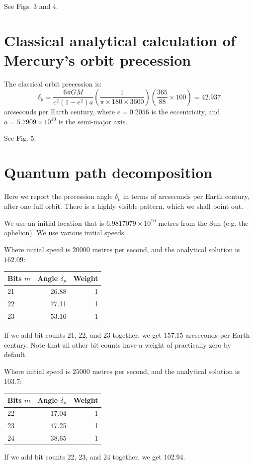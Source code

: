 \documentclass[12pt]{article}
\begin{document}
See Figs. 3 and 4.





\section{Classical analytical calculation of Mercury's orbit precession}

The classical orbit precession is:
\begin{equation}
\label{delta_p}
\delta_{p} = \frac{6 \pi G M}{c^2 (1 - e^2) a} \left( \frac{1}{ \pi \times 180 \times 3600} \right) \left( \frac{365}{88} \times 100 \right) = 42.937
\end{equation}
arcseconds per Earth century, where $e = 0.2056$ is the eccentricity, and $a = 5.7909 \times 10^{10}$ is the semi-major axis.

See Fig. 5.


\section{Quantum path decomposition}

Here we report the precession angle $\delta_{p}$ in terms of arcseconds per Earth century, after one full orbit.
There is a highly visible pattern, which we shall point out.

We use an initial location that is $6.9817079 \times 10^{10}$ metres from the Sun (e.g. the aphelion).
We use various initial speeds.

Where initial speed is $20000$ metres per second, and the analytical solution is $162.09$:
\begin{center}
\begin{tabular}{| l | r | r |}
  \hline
Bits $m$ & Angle $\delta_{p}$ & Weight\\
\hline
\hline
21 & 26.88 & 1 \\
22 & 77.11 & 1\\
23 & 53.16 & 1 \\
  \hline  
\end{tabular}
\end{center}
If we add bit counts 21, 22, and 23 together, we get $157.15$ arcseconds per Earth century.
Note that all other bit counts have a weight of practically zero by default.

Where initial speed is $25000$ metres per second, and the analytical solution is $103.7$:
\begin{center}
\begin{tabular}{| l | r | r |}
  \hline
Bits $m$ & Angle $\delta_{p}$ & Weight\\
\hline
\hline
22 & 17.04 & 1\\
23 & 47.25 & 1\\
24 & 38.65 & 1\\
  \hline  
\end{tabular}
\end{center}
If we add bit counts 22, 23, and 24 together, we get $102.94$.
\end{document}
